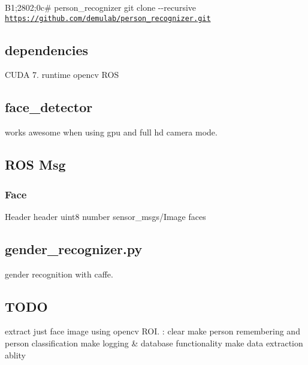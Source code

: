 B1;2802;0c\# person\-\_\-recognizer {\ttfamily git clone -\/-\/recursive \href{https://github.com/demulab/person_recognizer.git}{\tt https\-://github.\-com/demulab/person\-\_\-recognizer.\-git}} \subsection*{dependencies}

C\-U\-D\-A 7. runtime opencv R\-O\-S \subsection*{face\-\_\-detector}

works awesome when using gpu and full hd camera mode. \subsection*{R\-O\-S Msg}

\subsubsection*{Face}

Header header uint8 number sensor\-\_\-msgs/\-Image faces \subsection*{gender\-\_\-recognizer.\-py}

gender recognition with caffe. \subsection*{T\-O\-D\-O}

extract just face image using opencv R\-O\-I. \-: clear make person remembering and person classification make logging \& database functionality make data extraction ablity 